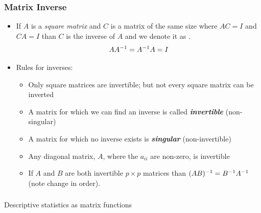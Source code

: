 \documentclass{beamer}
\begin{document}
\begin{frame}
  \frametitle{Matrix Inverse}

\begin{itemize}
\item If $A$ is a \emph{square matrix} and $C$ is a matrix of the same size where $AC = I$ and $CA=I$ than $C$ is the inverse of $A$ and we denote it as .
\[
AA^{-1} = A^{-1}A = I
\]

\item Rules for inverses:

\begin{itemize}
 \item Only square matrices are invertible; but not every square matrix can be inverted
 \item A matrix for which we can find an inverse is called \emph{\textbf{invertible}} (non-singular)
 \item A matrix for which no inverse exists is \emph{\textbf{singular}} (non-invertible)
 \item Any diagonal matrix, $A$, where the $a_{ii}$ are non-zero, is invertible
 \item If $A$ and $B$ are both invertible $p \times p$ matrices than $(AB)^{-1} = B^{-1} A^{-1}$ (note change in order).
\end{itemize}
 
\end{itemize}


\end{frame}


\begin{frame}
  \frametitle{}
\begin{center}
\begin{Huge}
{\rmfamily Descriptive statistics as matrix functions}
\end{Huge}
\end{center}
\end{frame}

\end{document}
